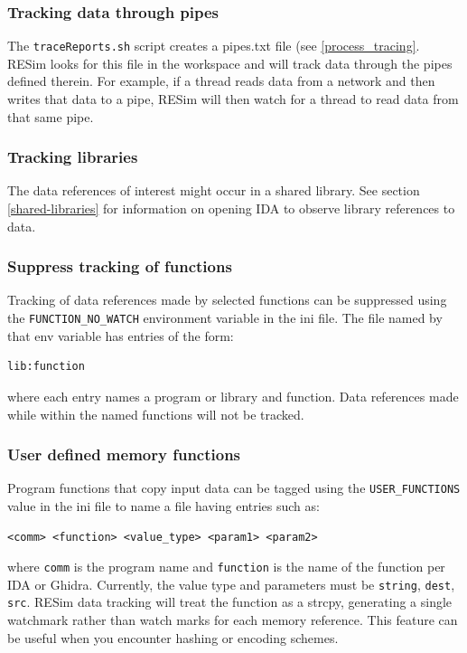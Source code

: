 \documentclass[titlepage]{article}
\begin{document}
\subsubsection{Tracking data through pipes}
The {\tt traceReports.sh} script creates a pipes.txt file (see \ref{process_tracing}.   RESim looks for this file in the workspace and will track data through the
pipes defined therein.  For example, if a thread reads data from a network and then writes that data to a pipe, RESim will then watch for a thread
to read data from that same pipe.

\subsubsection{Tracking libraries}
The data references of interest might occur in a shared library.  See section \ref{shared-libraries} for information on opening IDA to 
observe library references to data.

\subsubsection{Suppress tracking of functions}
\label{function_no_watch}
Tracking of data references made by selected functions can be suppressed using the {\tt FUNCTION\_NO\_WATCH} environment variable in the ini file.
The file named by that env variable has entries of the form:
\begin{verbatim}
lib:function
\end{verbatim}
\noindent where each entry names a program or library and function.  Data references made while within the named functions will not be tracked.

\subsubsection{User defined memory functions}
\label{user-funs}
Program functions that copy input data can be tagged using the {\tt USER\_FUNCTIONS} value in the ini file to name a file having entries such as:
\begin{verbatim}
<comm> <function> <value_type> <param1> <param2>
\end{verbatim}
\noindent where {\tt comm} is the program name and {\tt function} is the name of the function per IDA or Ghidra.  Currently, the value type and
parameters must be {\tt string}, {\tt dest}, {\tt src}.  RESim data tracking will treat the function as a strcpy, generating a single watchmark rather than
watch marks for each memory reference.  This feature can be useful when you encounter hashing or encoding schemes.
\end{document}
